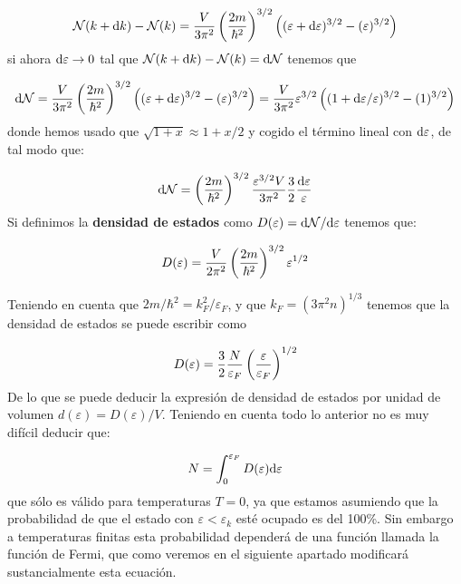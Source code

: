 \begin{equation*}
	\mathcal{N} (k+\mathrm{d} k) - \mathcal{N} (k) = \frac{V}{3\pi^2} \left( \frac{2m}{\hbar^2} \right)^{3/2} \left( (\varepsilon+\mathrm{d} \varepsilon)^{3/2} - (\varepsilon)^{3/2}  \right)
\end{equation*}
si ahora $\mathrm{d} \varepsilon \rightarrow 0$ tal que $\mathcal{N} (k+\mathrm{d} k) - \mathcal{N} (k) = \mathrm{d} \mathcal{N}$ tenemos que 

\begin{equation*}
	\mathrm{d} \mathcal{N} = \frac{V}{3\pi^2}\left( \frac{2m}{\hbar^2} \right)^{3/2} \left( (\varepsilon+\mathrm{d} \varepsilon)^{3/2} - (\varepsilon)^{3/2}  \right) = \frac{V}{3\pi^2} \varepsilon^{3/2} \left( (1+\mathrm{d} \varepsilon/\varepsilon)^{3/2} - (1)^{3/2}  \right) 
\end{equation*}
donde hemos usado que $\sqrt{1+x}\approx 1+x/2$ y cogido el término lineal con $\mathrm{d} \varepsilon$, de tal modo que:

\begin{equation}
	\mathrm{d} \mathcal{N} =\left( \frac{2m}{\hbar^2} \right)^{3/2} \frac{ \varepsilon^{3/2} V}{3\pi^2}\frac{3}{2} \frac{\mathrm{d} \varepsilon}{\varepsilon}
\end{equation}
Si definimos la \textbf{densidad de estados} como $D(\varepsilon) = \mathrm{d} \mathcal{N} / \mathrm{d} \varepsilon$ tenemos que:
\begin{mybox}
\begin{equation}
	D(\varepsilon) = \frac{V}{2\pi^2} \left( \frac{2m}{\hbar^2} \right)^{3/2} \varepsilon^{1/ 2}
\end{equation}
\end{mybox}
Teniendo en cuenta que $2m/\hbar^2 = k_F^2 / \varepsilon_F$, y que $k_F=(3\pi^2 n)^{1/3}$ tenemos que la densidad de estados se puede escribir como

\begin{equation}
	D(\varepsilon)  = \frac{3}{2}  \frac{N}{\varepsilon_F} \left( \frac{\varepsilon}{\varepsilon_F} \right)^{1/2}
\end{equation}
De lo que se puede deducir la expresión de densidad de estados por unidad de volumen $d(\varepsilon)=D(\varepsilon)/V$. Teniendo en cuenta todo lo anterior no es muy difícil deducir que:

\begin{equation}
	N = \int_{0}^{\varepsilon_F} D(\varepsilon) \mathrm{d} \varepsilon
\end{equation}
que sólo es válido para temperaturas $T=0$, ya que estamos asumiendo que la probabilidad de que el estado con $\varepsilon<\varepsilon_k$ esté ocupado es del 100\%. Sin embargo a temperaturas finitas esta probabilidad dependerá de una función llamada la función de Fermi, que como veremos en el siguiente apartado modificará sustancialmente esta ecuación. 

